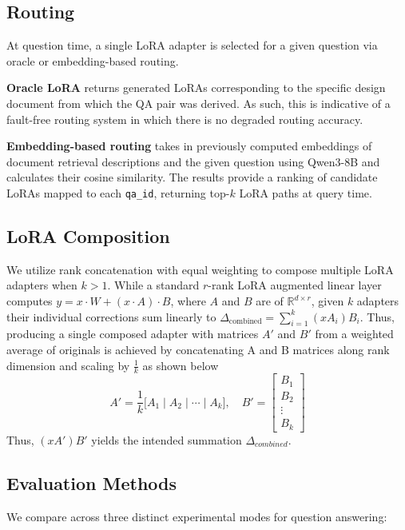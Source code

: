 \documentclass[conference,10.5pt]{IEEEtran}
\begin{document}
\subsection{Routing}
At question time, a single LoRA adapter is selected for a given question via oracle or embedding-based routing.

\textbf{Oracle LoRA} returns generated LoRAs corresponding to the specific design document from which the QA pair was derived. As such, this is indicative of a fault-free routing system in which there is no degraded routing accuracy.

\textbf{Embedding-based routing} takes in previously computed embeddings of document retrieval descriptions and the given question using Qwen3-8B and calculates their cosine similarity. The results provide a ranking of candidate LoRAs mapped to each \texttt{qa\_id}, returning top-$k$ LoRA paths at query time.    

\subsection{LoRA Composition}
We utilize rank concatenation with equal weighting to compose multiple LoRA adapters when $k>1$. While a standard $r$-rank LoRA augmented linear layer computes $y=x\cdot W+(x\cdot A)\cdot B$, where $A$ and $B$ are of $\mathbb{R}^{d\times r}$, given $k$ adapters their individual
corrections sum linearly to $\Delta _{\text{combined}} = \sum_{i=1}^{k} (x A_i) B_i$. Thus, producing a single composed adapter with matrices $A'$ and $B'$ from a weighted average of originals is achieved by concatenating A and B matrices along rank dimension and scaling by $\frac{1}{k}$ as shown below 
%
\begin{equation}
A' = \frac{1}{k}\bigl[A_1 \mid A_2 \mid \cdots \mid A_k\bigr], \quad
B' = \begin{bmatrix} B_1 \\ B_2 \\ \vdots \\ B_k \end{bmatrix}
\end{equation}
%
Thus, $(xA')B'$ yields the intended summation $\Delta_{combined}$. 


\subsection{Evaluation Methods}
We compare across three distinct experimental modes for question answering:
\end{document}
